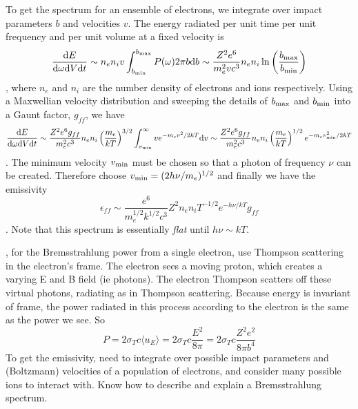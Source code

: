 To get the spectrum for an ensemble of electrons, we integrate over impact parameters $b$ and
velocities $v$.  The energy radiated per unit time per unit frequency and per unit volume
at a fixed velocity is
\begin{dmath*}
    \frac{\d E}{\d\omega\d V\d t}
        \sim n_en_iv\int_{b_{\rm min}}^{b_{\rm max}} P(\omega) 2\pi b\d b \nolinebreak
        \sim \frac{Z^2e^6}{m_e^2vc^3}n_en_i\ln\left(\frac{b_{\rm max}}{b_{\rm min}}\right)
\end{dmath*},
where $n_e$ and $n_i$ are the number density of electrons and ions respectively.
Using a Maxwellian velocity distribution and sweeping the details of $b_{\rm max}$ and
$b_{\rm min}$ into a Gaunt factor, $g_{ff}$, we have
\begin{dmath*}
    \frac{\d E}{\d\omega\d V\d t}
        \sim \frac{Z^2e^6g_{ff}}{m_e^2c^3}n_en_i\left(\frac{m_e}{kT}\right)^{3/2}\int_{v_{\rm min}}^\infty ve^{-m_ev^2/2kT} \d v
        \sim \frac{Z^2e^6g_{ff}}{m_e^2c^3}n_en_i\left(\frac{m_e}{kT}\right)^{1/2}e^{-m_ev_{\rm min}^2/2kT}
\end{dmath*}.
The minimum velocity $v_{\rm min}$ must be chosen so that a photon of frequency $\nu$ can
be created.  Therefore choose $v_{\rm min}=(2h\nu/m_e)^{1/2}$ and finally we have the emissivity
\begin{dmath}\boxed{
    \epsilon_{ff}
        \sim \frac{e^6}{m_e^{1/2}k^{1/2}c^3}Z^2n_en_iT^{-1/2}e^{-h\nu/kT}g_{ff}
}\end{dmath}.
Note that this spectrum is essentially \emph{flat} until $h\nu\sim kT$.

,
for the Bremsstrahlung power from a single electron, use Thompson scattering in the electron's 
frame.  The electron sees a moving proton, which creates a varying E and B field (ie photons).  
The electron Thompson scatters off these virtual photons, radiating as in Thompson scattering.
Because energy is invariant of frame, the power radiated in this process according to the 
electron is the same as the power we see.  So
\begin{displaymath}P=2\sigma_Tc\langle u_E \rangle=2\sigma_Tc\frac{E^2}{8\pi}=2\sigma_Tc\frac{Z^2e^2}{8\pi b^4}\end{displaymath}
To get the emissivity, need to integrate over possible impact parameters and (Boltzmann) 
velocities of a population of electrons, and consider many possible ions to interact with.  
Know how to describe and explain a Bremsstrahlung spectrum.

